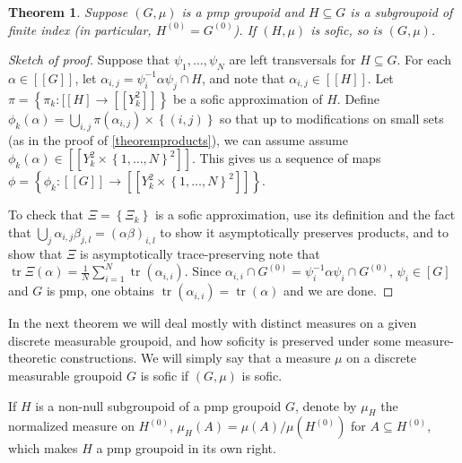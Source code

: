 \documentclass[11pt]{amsart}
\theoremstyle{plain}    \newtheorem{theorem}[generalnumbering]{Theorem}
\theoremstyle{plain}    \newtheorem{corollary}[generalnumbering]{Corollary}
\theoremstyle{definition}   \newtheorem{definition}[generalnumbering]{Definition}
\theoremstyle{definition}   \newtheorem{example}[generalnumbering]{Example}
\theoremstyle{plain}    \newtheorem{proposition}[generalnumbering]{Proposition}
\theoremstyle{plain}    \newtheorem{lemma}[generalnumbering]{Lemma}
\theoremstyle{plain}    \newtheorem{plainstyle}[generalnumbering]{\namefordifferentenvironment}
\theoremstyle{plain}    \newtheorem*{plainstyle*}{\namefordifferentenvironment}
\theoremstyle{definition}    \newtheorem{definitionstyle}[generalnumbering]{\namefordifferentenvironment}
\theoremstyle{definition}    \newtheorem*{definitionstyle*}{\namefordifferentenvironment}
\begin{document}
\begin{theorem}\label{theoremfiniteindexgroupoids}
Suppose $(G,\mu)$ is a pmp groupoid and $H\subseteq G$ is a subgroupoid of finite index (in particular, $H^{(0)}=G^{(0)}$). If $(H,\mu)$ is sofic, so is $(G,\mu)$.
\end{theorem}
\begin{proof}[Sketch of proof]
Suppose that $\psi_1,\ldots,\psi_N$ are left transversals for $H\subseteq G$. For each $\alpha\in [[G]]$, let $\alpha_{i,j}=\psi_i^{-1}\alpha\psi_j\cap H$, and note that $\alpha_{i,j}\in[[H]]$. Let $\pi=\left\{\pi_k:[[H]\to[[Y_k^2]]\right\}$ be a sofic approximation of $H$. Define $\phi_k(\alpha)=\bigcup_{i,j}\pi(\alpha_{i,j})\times\left\{(i,j)\right\}$ so that up to modifications on small sets (as in the proof of \ref{theoremproducts}), we can assume assume $\phi_k(\alpha)\in[[Y_k^2\times\left\{1,\ldots,N\right\}^2]]$. This gives us a sequence of maps $\phi=\left\{\phi_k:[[G]]\to[[Y_k^2\times\left\{1,\ldots,N\right\}^2]]\right\}$.

To check that $\Xi=\left\{\Xi_k\right\}$ is a sofic approximation, use its definition and the fact that $\bigcup_j\alpha_{i,j}\beta_{j,l}=(\alpha\beta)_{i,l}$ to show it asymptotically preserves products, and to show that $\Xi$ is asymptotically trace-preserving note that $\operatorname{tr}\Xi(\alpha)=\frac{1}{N}\sum_{i=1}^N\operatorname{tr}(\alpha_{i,i})$. Since $\alpha_{i,i}\cap G^{(0)}=\psi_i^{-1}\alpha\psi_i\cap G^{(0)}$, $\psi_i\in[G]$ and $G$ is pmp, one obtains $\operatorname{tr}(\alpha_{i,i})=\operatorname{tr}(\alpha)$ and we are done.\qedhere
\end{proof}

In the next theorem we will deal mostly with distinct measures on a given discrete measurable groupoid, and how soficity is preserved under some measure-theoretic constructions. We will simply say that a measure $\mu$ on a discrete measurable groupoid $G$ is sofic if $(G,\mu)$ is sofic.

If $H$ is a non-null subgroupoid of a pmp groupoid $G$, denote by $\mu_H$ the normalized measure on $H^{(0)}$, $\mu_H(A)=\mu(A)/\mu(H^{(0)})$ for $A\subseteq H^{(0)}$, which makes $H$ a pmp groupoid in its own right.
\end{document}
